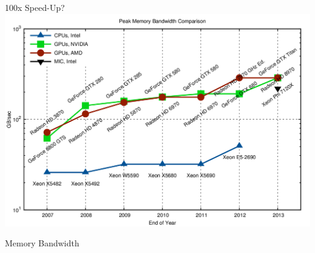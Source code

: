 \begin{frame}{100x Speed-Up?}
 \includegraphics[width=\textwidth]{figures/mem-bw}
 \begin{center}
  Memory Bandwidth
 \end{center}
\end{frame}


